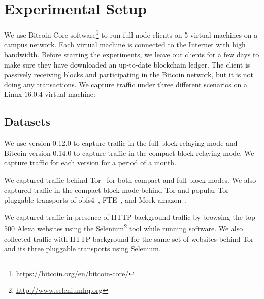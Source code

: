 \section{Experimental Setup}\label{sec:exp-dataset}

We use Bitcoin Core software\footnote{https://bitcoin.org/en/bitcoin-core/} to run full node \bc clients on 5 virtual machines on a campus network. Each virtual machine is connected to the Internet with high bandwidth. Before starting the experiments, we leave our \bc clients for a few days to make sure they have downloaded an up-to-date blockchain ledger. The \bc client is passively receiving blocks and participating in the Bitcoin network, but it is not doing any transactions.
We capture \bc traffic under three different scenarios on a Linux $16.0.4$ virtual machine: 
\subsection{Datasets}
 We use \bc version 0.12.0 to capture \bc traffic in the full block relaying mode and Bitcoin version 0.14.0 to capture traffic in the compact block relaying mode. We capture \bc traffic for each version for a period of a month.

 We captured \bc traffic behind Tor~\cite{tor} for both compact and full block modes.
We also captured \bc traffic in the compact block mode behind %
Tor and popular Tor pluggable transports of obfs4~\cite{obfs4}, FTE~\cite{fte}, and Meek-amazon~\cite{meek}.

 We captured \bc traffic in presence of HTTP background traffic by browsing the top 500 Alexa websites using the Selenium\footnote{\url{http://www.seleniumhq.org}} tool while running \bc software. We also collected \bc 
traffic with HTTP background for the same set of websites behind Tor and its three pluggable transports using Selenium.

\iffalse  \textbf{\bc traffic } in full and compact mode(30 days each). Also, \bc compact mode traffic over VPN, Tor and three pluggable transports(up to 20 days)\fi

